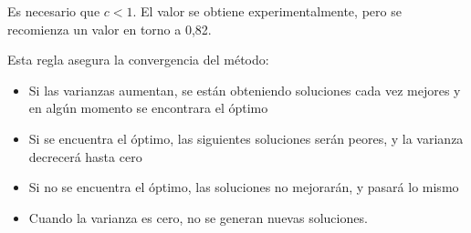 \documentclass[12pt, twoside, openright]{report} %
\begin{document}
Es necesario que $c<1$. El valor se obtiene experimentalmente, pero se recomienza un valor en torno a 0,82.

Esta regla asegura la convergencia del método:
\begin{itemize}
	\item Si las varianzas aumentan, se están obteniendo soluciones cada vez mejores y en algún momento se encontrara el óptimo 
	\item Si se encuentra el óptimo, las siguientes soluciones serán peores, y la varianza decrecerá hasta cero 
	\item Si no se encuentra el óptimo, las soluciones no mejorarán, y pasará lo mismo 
	\item Cuando la varianza es cero, no se generan nuevas soluciones.
\end{itemize}
\end{document}
